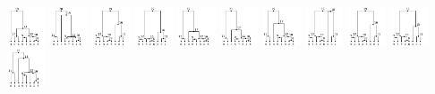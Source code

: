 \documentclass[fontscale=0.38,a0paper]{baposter}
\begin{document}
\begin{poster}
{    \includegraphics[width=0.085\textwidth]{tree0}
    \includegraphics[width=0.085\textwidth]{tree1}
    \includegraphics[width=0.085\textwidth]{tree2}
    \includegraphics[width=0.085\textwidth]{tree3}
    \includegraphics[width=0.085\textwidth]{tree4}
    \includegraphics[width=0.085\textwidth]{tree5}
    \includegraphics[width=0.085\textwidth]{tree6}
    \includegraphics[width=0.085\textwidth]{tree7}
    \includegraphics[width=0.085\textwidth]{tree8}
    \includegraphics[width=0.085\textwidth]{tree9}
    \includegraphics[width=0.085\textwidth]{tree10}


}

\end{poster}%
\end{document}
